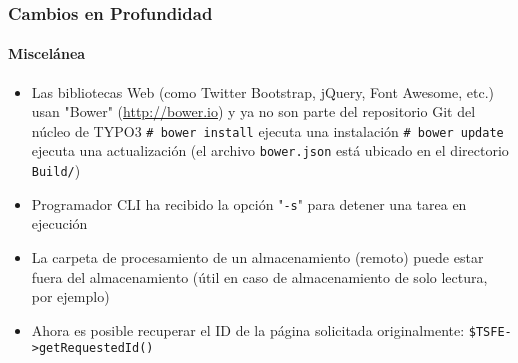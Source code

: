 \begin{frame}[fragile]
	\frametitle{Cambios en Profundidad}
	\framesubtitle{Miscelánea}

	\begin{itemize}

		\item Las bibliotecas Web (como Twitter Bootstrap, jQuery, Font Awesome, etc.) usan
			"Bower" (\url{http://bower.io}) y ya no son parte del repositorio Git del núcleo de TYPO3 \newline
			\small
				\texttt{\# bower install}	\tabto{3.4cm}ejecuta una instalación \newline
				\texttt{\# bower update}		\tabto{3.4cm}ejecuta una actualización \newline
			\normalsize
			(el archivo \texttt{bower.json} está ubicado en el directorio \texttt{Build/})

		\item Programador CLI ha recibido la opción "\texttt{-s}" para detener una tarea en ejecución

		\item La carpeta de procesamiento de un almacenamiento (remoto) puede estar
			fuera del almacenamiento (útil en caso de almacenamiento de solo lectura, por ejemplo)

		\item Ahora es posible recuperar el ID de la página solicitada originalmente:\newline
			\texttt{\$TSFE->getRequestedId()}

	\end{itemize}

\end{frame}

